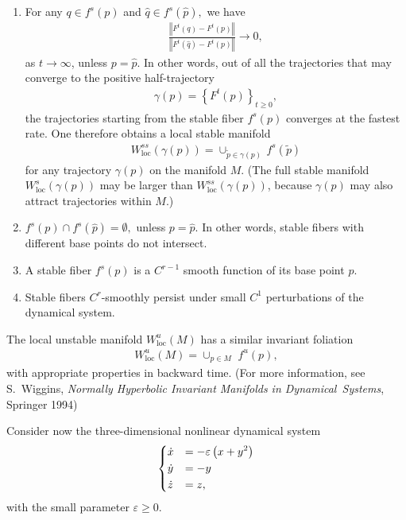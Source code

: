 \begin{ex}
\begin{exercise}
\begin{enumerate}
\item For any $q\in f^{s}(p)$ and $\hat{q}\in f^{s}(\hat{p}),$ we
have
\begin{align}
\frac{\left\Vert F^{t}(q)-F^{t}(p)\right\Vert }{\left\Vert F^{t}(\hat{q})-F^{t}(p)\right\Vert }\rightarrow0,
\end{align}
as $t\rightarrow\infty$, unless $p=\hat{p}.$ In other words, out
of all the trajectories that may converge to the positive half-trajectory
\begin{align}
\gamma(p)=\left\{ F^{t}(p)\right\} _{t\geq0},
\end{align}
the trajectories starting from the stable fiber $f^{s}(p)$ converges
at the fastest rate. One therefore obtains a local stable manifold
\begin{align}
W_{\mathrm{loc}}^{ss}(\gamma(p))=\cup_{\tilde{p}\in\gamma(p)}\,f^{s}(\tilde{p})
\end{align}
for any trajectory $\gamma(p)$ on the manifold $M$. (The full stable
manifold $W_{\mathrm{loc}}^{s}(\gamma(p))$ may be larger than $W_{\mathrm{loc}}^{ss}(\gamma(p))$,
because $\gamma(p)$ may also attract trajectories within $M$.)

\item $f^{s}(p)\cap f^{s}(\hat{p})=\emptyset,$ unless $p=\hat{p}.$
In other words, stable fibers with different base points do not intersect.

\item A stable fiber $f^{s}(p)$ is a $C^{r-1}$ smooth function of
its base point $p$.

\item Stable fibers $C^{r}$-smoothly persist under small $C^{1}$
perturbations of the dynamical system.
\end{enumerate}

The local unstable manifold $W_{\mathrm{loc}}^{u}(M)$ has a similar
invariant foliation 
\begin{align}
W_{\mathrm{loc}}^{u}(M)=\cup_{p\in M}\,\,f^{u}(p),
\end{align}
with appropriate properties in backward time. (For more information,
see S.\ Wiggins, \emph{Normally Hyperbolic Invariant Manifolds in
Dynamical\ Systems}, Springer 1994)

Consider now the three-dimensional nonlinear dynamical system
\begin{align}
	\begin{dcases}
\dot{x} &=  -\varepsilon\left(x+y^{2}\right)\\
\dot{y} &=  -y\\
\dot{z} &=  z,
	\end{dcases}
\end{align}
with the small parameter $\varepsilon\geq0$.


\end{exercise}
\end{ex}
